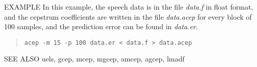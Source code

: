 \begin{options}
\end{options}

\begin{qsection}{EXAMPLE}
	In this example, the speech data is in the file {\em data.f}
        in float format, and the cepstrum coefficients are written in
        the file {\em data.acep} for every block of 100 samples,
        and the prediction error can be found in {\em data.er}.
 \begin{quote}
	\verb!acep -m 15 -p 100 data.er < data.f > data.acep!
 \end{quote} 
\end{qsection}

\begin{qsection}{SEE ALSO}
	uels, gcep, mcep, mgcep, amcep, agcep, lmadf
\end{qsection}
